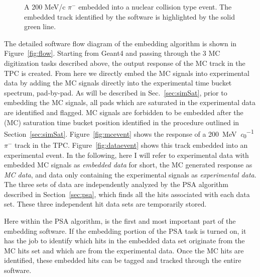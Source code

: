\begin{figure}[!htb]%
    \centering
    \qquad
  
    \caption{A 200 MeV/c $\pi^-$ embedded into a nuclear collision type event. The embedded track identified by the software is highlighted by the solid green line. }
	\label{fig:embedtrack}
\end{figure}


The detailed software flow diagram of the embedding algorithm is shown in Figure~\ref{fig:flow}. Starting from Geant4 and passing through the 3 MC digitization tasks described above, the output response of the MC track in the TPC is created. From here we directly embed the MC signals into experimental data by adding the MC signals directly into the experimental time bucket spectrum, pad-by-pad. As will be described in Sec.~\ref{sec:simSat}, prior to embedding the MC signals, all pads which are saturated in the experimental data are identified and flagged. MC signals are forbidden to be embedded after the (MC) saturation time bucket position identified in the procedure outlined in Section~\ref{sec:simSat}. Figure~\ref{fig:mcevent} shows the response of a \SI{200}{\mega\electronvolt\per\clight} $\pi^-$ track in the TPC. Figure~\ref{fig:dataevent} shows this track embedded into an experimental event. In the following, here I will refer to experimental data with embedded MC signals as \emph{embedded data} for short, the MC generated response as \emph{MC data}, and data only containing the experimental signals as \emph{experimental data}. The three sets of data are independently analyzed by the PSA algorithm described in Section~\ref{sec:psa},  which finds all the hits associated with each data set. These three independent hit data sets are temporarily stored. 

Here within the PSA algorithm, is the first and most important part of the embedding software. If the embedding portion of the PSA task is turned on,  it has the job to identify which hits in the embedded data set originate from the MC hits set and which are from the experimental data. Once the MC hits are identified, these embedded hits can be tagged and tracked through the entire software. 


